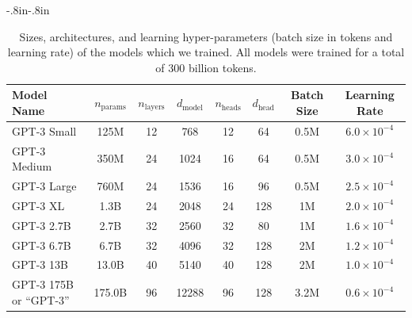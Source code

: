
\begin{table}
    
    \begin{adjustwidth}{-.8in}{-.8in}
    \begin{center}
        
        \begin{tabular}{l c c c c c c c}
        \toprule
        Model Name & $n_{\mathrm{params}}$ & $n_{\mathrm{layers}}$ & $d_{\mathrm{model}}$ & $n_{\mathrm{heads}}$ & $d_{\mathrm{head}}$  & Batch Size & Learning Rate \\
        \midrule
GPT-3 Small & 125M & 12 & 768 & 12 & 64 & 0.5M & $6.0 \times 10^{-4}$ \\                              
GPT-3 Medium & 350M & 24 & 1024 & 16 & 64 & 0.5M & $3.0 \times 10^{-4}$ \\                             
GPT-3 Large & 760M & 24 & 1536 & 16 & 96 & 0.5M & $2.5 \times 10^{-4}$ \\                             
GPT-3 XL & 1.3B & 24 & 2048 & 24 & 128 & 1M & $2.0 \times 10^{-4}$ \\                            
GPT-3 2.7B   & 2.7B & 32 & 2560 & 32 & 80 & 1M & $1.6 \times 10^{-4}$ \\                             
GPT-3 6.7B   & 6.7B & 32 & 4096 & 32 & 128 & 2M & $1.2 \times 10^{-4}$ \\                            
GPT-3 13B  & 13.0B & 40 & 5140 & 40 & 128 & 2M & $1.0 \times 10^{-4}$ \\                           
GPT-3 175B or ``GPT-3'' & 175.0B & 96 & 12288 & 96 & 128 & 3.2M & $0.6 \times 10^{-4}$ \\
        \bottomrule
        \end{tabular}
    \end{center}
    \end{adjustwidth}
    \caption{Sizes, architectures, and learning hyper-parameters (batch size in tokens and learning rate) of the models which we trained. All models were trained for a total of 300 billion tokens.}
    \label{table:param}
\end{table}